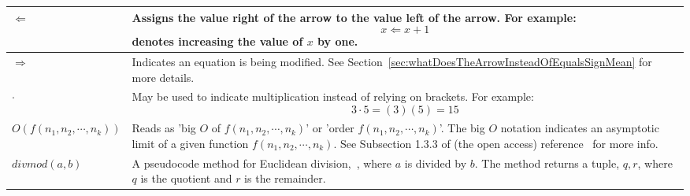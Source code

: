\begin{xltabular}{\linewidth}{ l | X }
$\Longleftarrow$ & Assigns the value right of the arrow to the value left of the arrow. For example: $$x \Longleftarrow x + 1$$ denotes increasing the value of $x$ by one.
\\ \hline

$\Rightarrow$ & Indicates an equation is being modified. See Section~\ref{sec:whatDoesTheArrowInsteadOfEqualsSignMean} for more details.
\\ \hline

$\cdot$ & May be used to indicate multiplication instead of relying on brackets. For example: $$3 \cdot 5 = (3)(5) = 15$$
\\ \hline

$O\left(f(n_1,n_2, \cdots ,n_k)\right)$ & Reads as 'big $O$ of $f(n_1,n_2, \cdots ,n_k)$' or 'order $f(n_1,n_2, \cdots ,n_k)$'. The big $O$ notation indicates an asymptotic limit of a given function $f(n_1,n_2, \cdots ,n_k)$. See Subsection 1.3.3 of (the open access) reference~\cite{morin2013open} for more info.
\\ \hline

$\mathit{divmod}(a,b)$ & A pseudocode method for Euclidean division,~\cite{EuclideanDivisionWiki}, where $a$ is divided by $b$. The method returns a tuple, $q,r$, where $q$ is the quotient and $r$ is the remainder.
\\ \hline

\end{xltabular}




